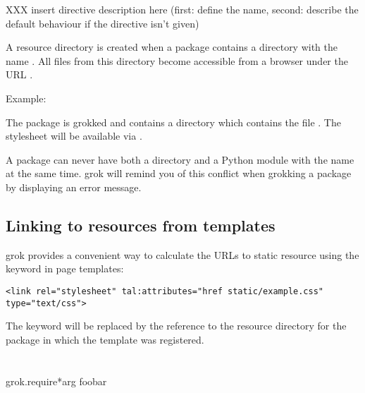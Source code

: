         XXX insert directive description here (first: define the name, second:
        describe the default behaviour if the directive isn't given)

        A resource directory is created when a package contains a directory
        with the name . All files from this directory become
        accessible from a browser under the URL
        .

        \begin{bf}Example:\end{bf} The package  is grokked and
        contains a directory  which contains the file
        . The stylesheet will be available via
        .

        \begin{notice}
        A package can never have both a  directory and a Python
        module with the name  at the same time. grok will
        remind you of this conflict when grokking a package by displaying an
        error message.
        \end{notice}

        \subsection{Linking to resources from templates}

            grok provides a convenient way to calculate the URLs to static
            resource using the keyword  in page templates:

            \begin{verbatim}
<link rel="stylesheet" tal:attributes="href static/example.css" type="text/css">
            \end{verbatim}

            The keyword  will be replaced by the reference to
            the resource directory for the package in which the template was
            registered.

    \section{}

        \begin{funcdesc}{grok.require}{*arg}
        foobar
        \end{funcdesc}

